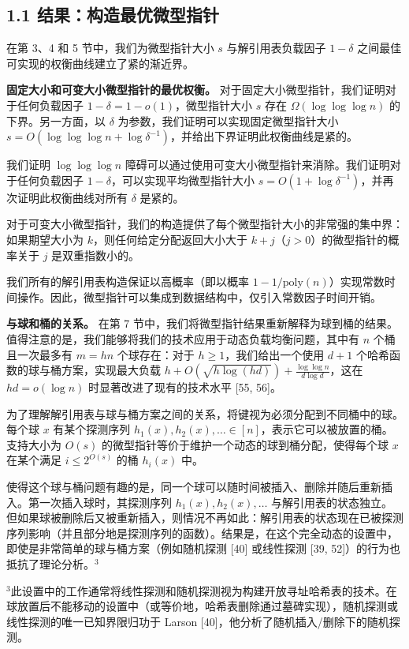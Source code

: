 \documentclass[12pt,a4paper]{ctexart}
\theoremstyle{remark}
\begin{document}
\subsection{1.1 结果：构造最优微型指针}
在第 3、4 和 5 节中，我们为微型指针大小 $s$ 与解引用表负载因子 $1-\delta$ 之间最佳可实现的权衡曲线建立了紧的渐近界。

\textbf{固定大小和可变大小微型指针的最优权衡。} 对于固定大小微型指针，我们证明对于任何负载因子 $1-\delta=1-o(1)$，微型指针大小 $s$ 存在 $\Omega(\log\log\log n)$ 的下界。另一方面，以 $\delta$ 为参数，我们证明可以实现固定微型指针大小 $s=O(\log\log\log n+\log\delta^{-1})$，并给出下界证明此权衡曲线是紧的。

我们证明 $\log\log\log n$ 障碍可以通过使用可变大小微型指针来消除。我们证明对于任何负载因子 $1-\delta$，可以实现平均微型指针大小 $s=O(1+\log\delta^{-1})$，并再次证明此权衡曲线对所有 $\delta$ 是紧的。

对于可变大小微型指针，我们的构造提供了每个微型指针大小的非常强的集中界：如果期望大小为 $k$，则任何给定分配返回大小大于 $k+j$（$j>0$）的微型指针的概率关于 $j$ 是双重指数小的。

我们所有的解引用表构造保证以高概率（即以概率 $1-1/\text{poly}(n)$）实现常数时间操作。因此，微型指针可以集成到数据结构中，仅引入常数因子时间开销。

\textbf{与球和桶的关系。} 在第 7 节中，我们将微型指针结果重新解释为球到桶的结果。值得注意的是，我们能够将我们的技术应用于动态负载均衡问题，其中有 $n$ 个桶且一次最多有 $m=hn$ 个球存在：对于 $h\geq 1$，我们给出一个使用 $d+1$ 个哈希函数的球与桶方案，实现最大负载 $h+O\left(\sqrt{h\log(hd)}\right)+\frac{\log\log n}{d\log d}$，这在 $hd=o(\log n)$ 时显著改进了现有的技术水平 [55, 56]。

为了理解解引用表与球与桶方案之间的关系，将键视为必须分配到不同桶中的球。每个球 $x$ 有某个探测序列 $h_1(x),h_2(x),\ldots\in[n]$，表示它可以被放置的桶。支持大小为 $O(s)$ 的微型指针等价于维护一个动态的球到桶分配，使得每个球 $x$ 在某个满足 $i\leq 2^{O(s)}$ 的桶 $h_i(x)$ 中。

使得这个球与桶问题有趣的是，同一个球可以随时间被插入、删除并随后重新插入。第一次插入球时，其探测序列 $h_1(x),h_2(x),\ldots$ 与解引用表的状态独立。但如果球被删除后又被重新插入，则情况不再如此：解引用表的状态现在已被探测序列影响（并且部分地是探测序列的函数）。结果是，在这个完全动态的设置中，即使是非常简单的球与桶方案（例如随机探测 [40] 或线性探测 [39, 52]）的行为也抵抗了理论分析。$^3$

$^3$此设置中的工作通常将线性探测和随机探测视为构建开放寻址哈希表的技术。在球放置后不能移动的设置中（或等价地，哈希表删除通过墓碑实现），随机探测或线性探测的唯一已知界限归功于 Larson [40]，他分析了随机插入/删除下的随机探测。
\end{document}
